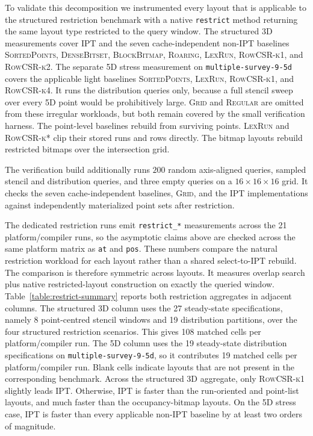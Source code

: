 \documentclass[manuscript,screen,review]{acmart}
\theoremstyle{definition}
\theoremstyle{plain}
\begin{document}
To validate this decomposition we instrumented every layout that is
applicable to the structured restriction benchmark with a native
\texttt{restrict} method returning the same layout type restricted to
the query window. The structured 3D measurements cover IPT and the
seven cache-independent non-IPT baselines \textsc{SortedPoints},
\textsc{DenseBitset}, \textsc{BlockBitmap}, \textsc{Roaring},
\textsc{LexRun}, \textsc{RowCSR-k1}, and \textsc{RowCSR-k2}. The
separate 5D stress measurement on \texttt{multiple-survey-9-5d} covers
the applicable light baselines \textsc{SortedPoints}, \textsc{LexRun},
\textsc{RowCSR-k1}, and \textsc{RowCSR-k4}. It runs the distribution
queries only, because a full stencil sweep over every 5D point would
be prohibitively large. \textsc{Grid} and \textsc{Regular} are omitted
from these irregular workloads, but both remain covered by the small
verification harness. The point-level baselines rebuild from surviving
points. \textsc{LexRun} and \textsc{RowCSR-k*} clip their stored runs
and rows directly. The bitmap layouts rebuild restricted bitmaps over
the intersection grid.

The verification build additionally runs $200$ random axis-aligned
queries, sampled stencil and distribution queries, and three empty
queries on a $16\!\times\!16\!\times\!16$ grid. It checks the seven
cache-independent baselines, \textsc{Grid}, and the IPT implementations
against independently materialized point sets after restriction.

The dedicated restriction runs emit \texttt{restrict\_*}
measurements across the 21 platform/compiler runs, so the asymptotic
claims above are checked across the same platform matrix as
\texttt{at} and \texttt{pos}. These numbers compare the natural
restriction workload for each layout rather than a shared select-to-IPT
rebuild. The comparison is therefore symmetric across layouts. It
measures overlap search plus native restricted-layout construction on
exactly the queried window.
Table~\ref{table:restrict-summary} reports both restriction
aggregates in adjacent columns. The structured 3D column uses the 27 steady-state
specifications, namely 8 point-centred stencil windows and
19 distribution partitions, over the four structured restriction
scenarios. This gives 108 matched cells per platform/compiler run.
The 5D column uses the 19 steady-state distribution specifications on
\texttt{multiple-survey-9-5d}, so it contributes 19 matched cells per
platform/compiler run. Blank cells indicate layouts that are not
present in the corresponding benchmark. Across the structured 3D
aggregate, only \textsc{RowCSR-k1} slightly leads IPT. Otherwise, IPT
is faster than the run-oriented and point-list layouts, and much
faster than the occupancy-bitmap layouts. On the 5D stress case, IPT
is faster than every applicable non-IPT baseline by at least two
orders of magnitude.
\end{document}
